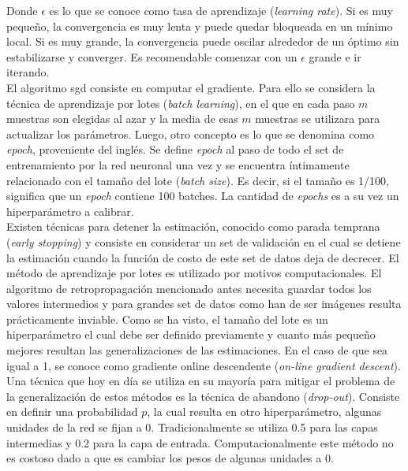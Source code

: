 \indent Donde $\epsilon$ es lo que se conoce como tasa de aprendizaje (\textit{learning rate}). Si es muy pequeño,
la convergencia es muy lenta y puede quedar bloqueada en un mínimo local. Si es muy grande, la convergencia puede
oscilar alrededor de un óptimo sin estabilizarse y converger. Es recomendable comenzar con un $\epsilon$ grande e ir
iterando. \\
\indent El algoritmo \acrshort{sgd} consiste en computar el gradiente. Para ello se considera la técnica de
aprendizaje por lotes (\textit{batch learning}), en el que en cada paso $m$ muestras son elegidas al azar y la media
de esas $m$ muestras se utilizara para actualizar los parámetros. Luego, otro concepto es lo que se denomina como
\textit{epoch}, proveniente del inglés. Se define \textit{epoch} al paso de todo el set de entrenamiento por la red
neuronal una vez y se encuentra íntimamente relacionado con el tamaño del lote (\textit{batch size}). Es decir, si
el tamaño es 1/100, significa que un \textit{epoch} contiene 100 batches. La cantidad de \textit{epochs} es a su vez
un hiperparámetro a calibrar. \\
\indent Existen técnicas para detener la estimación, conocido como parada temprana (\textit{early stopping}) y
consiste en considerar un set de validación en el cual se detiene la estimación cuando la función de costo de este
set de datos deja de decrecer. El método de aprendizaje por lotes es utilizado por motivos computacionales. El
algoritmo de retropropagación mencionado antes necesita guardar todos los valores intermedios y para grandes set de
datos como han de ser imágenes resulta prácticamente inviable. Como se ha visto, el tamaño del lote es un
hiperparámetro el cual debe ser definido previamente y cuanto más pequeño mejores resultan las generalizaciones de
las estimaciones. En el caso de que sea igual a 1, se conoce como gradiente online descendente (\textit{on-line
gradient descent}). \\
\indent Una técnica que hoy en día se utiliza en su mayoría para mitigar el problema de la generalización de estos
métodos es la técnica de abandono (\textit{drop-out}). Consiste en definir una probabilidad $p$, la cual resulta en
otro hiperparámetro, algunas unidades de la red se fijan a 0. Tradicionalmente se utiliza 0.5 para las capas
intermedias y 0.2 para la capa de entrada. Computacionalmente este método no es costoso dado a que es cambiar los
pesos de algunas unidades a 0.


